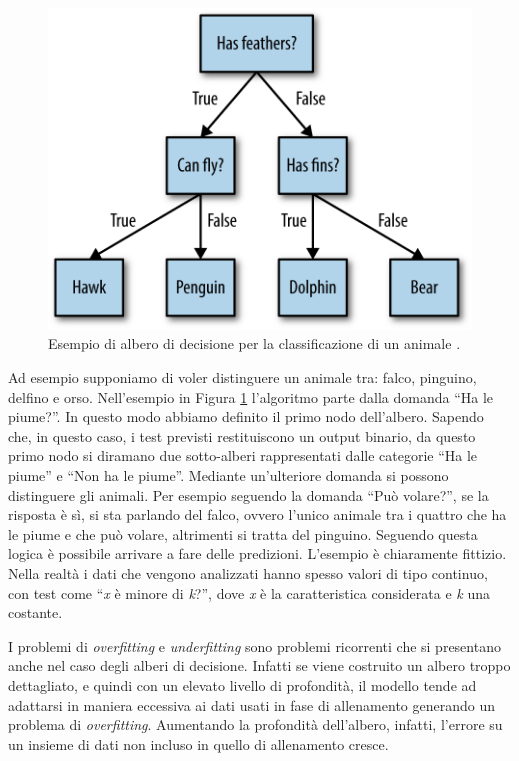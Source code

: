 \documentclass[a4paper,12pt]{report}
\begin{document}
\begin{figure}[h]
    \centering
    \includegraphics[scale=0.35]{images/decisione_tree.png}
    \caption{Esempio di albero di decisione per la classificazione di un animale \cite{figure_copyright}.}
    \label{fig:decision_tree}

\end{figure}

Ad esempio supponiamo di voler distinguere un animale tra: falco, pinguino, delfino e orso. Nell'esempio in Figura \ref{fig:decision_tree} l'algoritmo parte dalla domanda ``Ha le piume?''. In questo modo abbiamo definito il primo nodo dell'albero. Sapendo che, in questo caso, i test previsti restituiscono un output binario, da questo primo nodo si diramano due sotto-alberi rappresentati dalle categorie ``Ha le piume'' e ``Non ha le piume''. Mediante un'ulteriore domanda si possono distinguere gli animali. Per esempio seguendo la domanda ``Può volare?'', se la risposta è sì, si sta parlando del falco, ovvero l'unico animale tra i quattro che ha le piume e che può volare, altrimenti si tratta del pinguino. Seguendo questa logica è possibile arrivare a fare delle predizioni. 
L'esempio è chiaramente fittizio. Nella realtà i dati che vengono analizzati hanno spesso valori di tipo continuo, con test come ``\textit{x} è minore di \textit{k}?'', dove \textit{x} è la caratteristica considerata e \textit{k} una costante.

I problemi di \textit{overfitting} e \textit{underfitting} sono problemi ricorrenti che si presentano anche nel caso degli alberi di decisione. Infatti se viene costruito un albero troppo dettagliato, e quindi con un elevato livello di profondità, il modello tende ad adattarsi in maniera eccessiva ai dati usati in fase di allenamento generando un problema di \textit{overfitting}.
Aumentando la profondità dell'albero, infatti, l'errore su un insieme di dati non incluso in quello di allenamento cresce.
\end{document}
